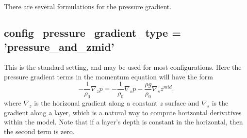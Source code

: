 There are several formulations for the pressure gradient.

\subsection{ config\_pressure\_gradient\_type = 'pressure\_and\_zmid'}
This is the standard setting, and may be used for most configurations.  Here the pressure gradient terms in the momentum equation will have the form
\begin{equation}
\label{ocean:grad p}
- \frac{1}{\rho_0}\nabla_z p = - \frac{1}{\rho_0}\nabla_s p - \frac{\rho g}{\rho_0}\nabla_s z^{mid}.
\end{equation}
where $\nabla_z$ is the horizonal gradient along a constant $z$ surface and $\nabla_s$ is the gradient along a layer, which is a natural way to compute horizontal derivatives within the model.  Note that if a layer's depth is constant in the horizontal, then the second term is zero.

